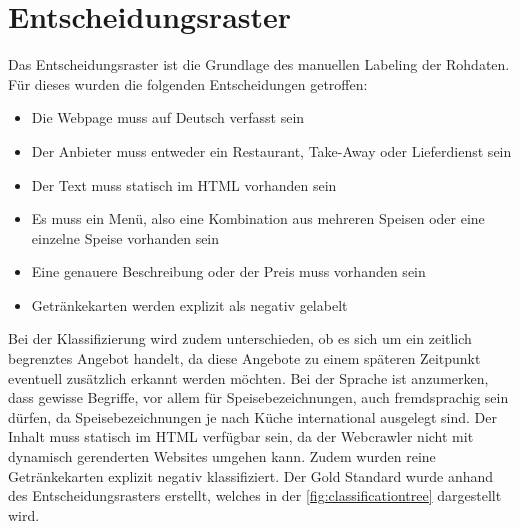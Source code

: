 \section{Entscheidungsraster}
Das Entscheidungsraster ist die Grundlage des manuellen Labeling der Rohdaten.
Für dieses wurden die folgenden Entscheidungen getroffen:
\begin{itemize}
	\item Die Webpage muss auf Deutsch verfasst sein
	\item Der Anbieter muss entweder ein Restaurant, Take-Away oder Lieferdienst sein
	\item Der Text muss statisch im HTML vorhanden sein
	\item Es muss ein Menü, also eine Kombination aus mehreren Speisen oder eine einzelne Speise vorhanden sein
	\item Eine genauere Beschreibung oder der Preis muss vorhanden sein
	\item Getränkekarten werden explizit als negativ gelabelt
\end{itemize}
Bei der Klassifizierung wird zudem unterschieden, ob es sich um ein zeitlich begrenztes Angebot handelt, da diese Angebote zu einem späteren Zeitpunkt eventuell zusätzlich erkannt werden möchten.
Bei der Sprache ist anzumerken, dass gewisse Begriffe, vor allem für Speisebezeichnungen, auch fremdsprachig sein dürfen, da Speisebezeichnungen je nach Küche international ausgelegt sind.
Der Inhalt muss statisch im HTML verfügbar sein, da der Webcrawler nicht mit dynamisch gerenderten Websites umgehen kann.
Zudem wurden reine Getränkekarten explizit negativ klassifiziert.
\FloatBarrier
Der Gold Standard wurde anhand des Entscheidungsrasters erstellt, welches in der \cref{fig:classificationtree} dargestellt wird.
